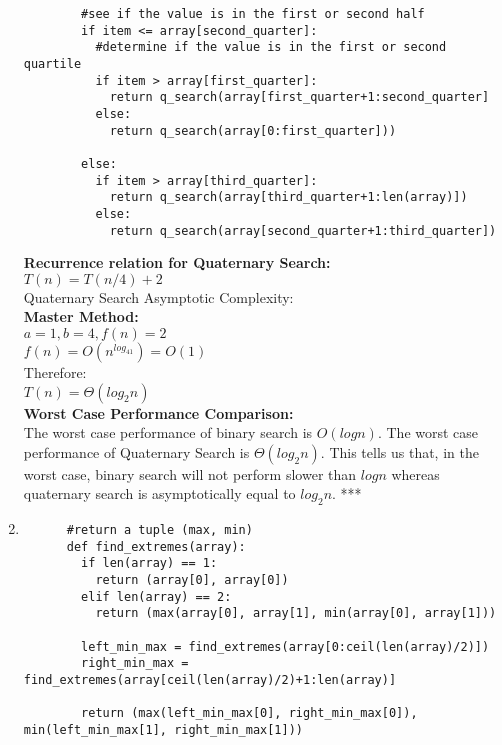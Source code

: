 \documentclass{article}
\begin{document}
\begin{enumerate}
\begin{verbatim}
        #see if the value is in the first or second half
        if item <= array[second_quarter]:
          #determine if the value is in the first or second quartile
          if item > array[first_quarter]:
            return q_search(array[first_quarter+1:second_quarter]
          else:
            return q_search(array[0:first_quarter]))

        else:
          if item > array[third_quarter]:
            return q_search(array[third_quarter+1:len(array)])
          else:
            return q_search(array[second_quarter+1:third_quarter])
    \end{verbatim}
    \textbf{Recurrence relation for Quaternary Search:}\\
      $T(n) = T(n/4) + 2$\\
    Quaternary Search Asymptotic Complexity:\\
    \textbf{Master Method:}\\
    $a=1,b=4,f(n)=2$\\
    $f(n) = O(n^{log_41}) = O(1)$\\
    Therefore:\\
    $T(n) = \Theta(log_2n)$\\
    \textbf{Worst Case Performance Comparison:}\\
    The worst case performance of binary search is $O(logn)$.  The worst case performance of Quaternary Search is $\Theta(log_2n)$.  This tells us that, in the worst case, binary search will not perform slower than $logn$ whereas quaternary search is asymptotically equal to $log_2n$. ***

    \item\begin{verbatim}
      #return a tuple (max, min)
      def find_extremes(array):
        if len(array) == 1:
          return (array[0], array[0])
        elif len(array) == 2:
          return (max(array[0], array[1], min(array[0], array[1]))

        left_min_max = find_extremes(array[0:ceil(len(array)/2)])
        right_min_max = find_extremes(array[ceil(len(array)/2)+1:len(array)]

        return (max(left_min_max[0], right_min_max[0]), min(left_min_max[1], right_min_max[1]))

    \end{verbatim}
  \end{enumerate}
\end{document}
